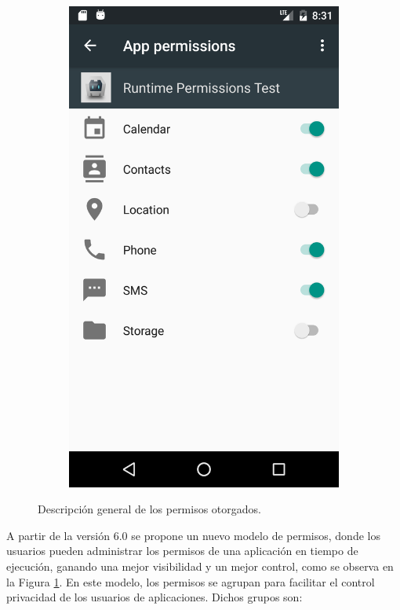 \begin{figure}[hbtp]
\begin{subfigure}{0.3\linewidth}
        \includegraphics[width=\linewidth]{imgs/chapter1/app-permissions}
    \end{subfigure}
    \caption{Descripción general de los permisos otorgados.}
	\label{fig:ch01:app-permissions-overview}
\end{figure}
A partir de la versión 6.0 se propone un nuevo modelo de permisos, donde los usuarios pueden administrar los permisos de una aplicación en tiempo de ejecución, ganando una mejor visibilidad y un mejor control, como se observa en la Figura \ref{fig:ch01:app-permissions-overview}. En este modelo, los permisos se agrupan para facilitar el control privacidad de los usuarios de aplicaciones. Dichos grupos son:
